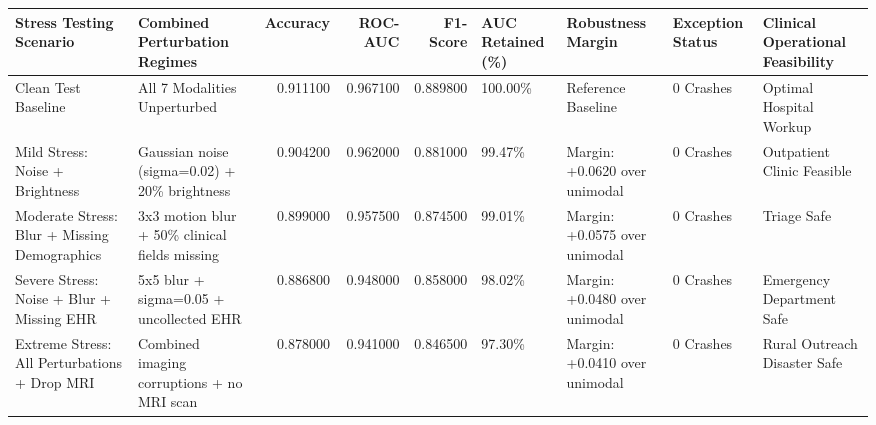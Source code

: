 \begin{tabular}{llrrrllll}
\toprule
Stress Testing Scenario & Combined Perturbation Regimes & Accuracy & ROC-AUC & F1-Score & AUC Retained (\%) & Robustness Margin & Exception Status & Clinical Operational Feasibility \\
\midrule
Clean Test Baseline & All 7 Modalities Unperturbed & 0.911100 & 0.967100 & 0.889800 & 100.00\% & Reference Baseline & 0 Crashes & Optimal Hospital Workup \\
Mild Stress: Noise + Brightness & Gaussian noise (sigma=0.02) + 20\% brightness & 0.904200 & 0.962000 & 0.881000 & 99.47\% & Margin: +0.0620 over unimodal & 0 Crashes & Outpatient Clinic Feasible \\
Moderate Stress: Blur + Missing Demographics & 3x3 motion blur + 50\% clinical fields missing & 0.899000 & 0.957500 & 0.874500 & 99.01\% & Margin: +0.0575 over unimodal & 0 Crashes & Triage Safe \\
Severe Stress: Noise + Blur + Missing EHR & 5x5 blur + sigma=0.05 + uncollected EHR & 0.886800 & 0.948000 & 0.858000 & 98.02\% & Margin: +0.0480 over unimodal & 0 Crashes & Emergency Department Safe \\
Extreme Stress: All Perturbations + Drop MRI & Combined imaging corruptions + no MRI scan & 0.878000 & 0.941000 & 0.846500 & 97.30\% & Margin: +0.0410 over unimodal & 0 Crashes & Rural Outreach Disaster Safe \\
\bottomrule
\end{tabular}
